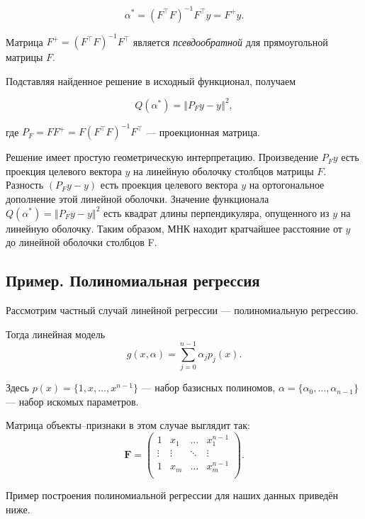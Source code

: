 \documentclass[11pt,a4paper]{article}
\begin{document}
\[ \alpha^* = (F^{\top} F)^{-1} F^{\top} y = F^{+} y. \]

Матрица \(F^{+} = (F^{\top} F)^{-1} F^{\top}\) является
\emph{псевдообратной} для прямоугольной матрицы \(F\).

Подставляя найденное решение в исходный функционал, получаем

\[ Q(\alpha^*) = \left\Vert P_Fy - y \right\Vert^2, \]

где \(P_F = FF^{+} = F(F^{\top}F)^{-1}F^{\top}\) --- проекционная
матрица.

Решение имеет простую геометрическую интерпретацию. Произведение
\(P_Fy\) есть проекция целевого вектора \(y\) на линейную оболочку
столбцов матрицы \(F\). Разность \((P_Fy-y)\) есть проекция целевого
вектора \(y\) на ортогональное дополнение этой линейной оболочки.
Значение функционала \(Q(\alpha^*) = \left\Vert P_Fy - y \right\Vert^2\)
есть квадрат длины перпендикуляра, опущенного из \(y\) на линейную
оболочку. Таким образом, МНК находит кратчайшее расстояние от \(y\) до
линейной оболочки столбцов F.

    \hypertarget{ux43fux440ux438ux43cux435ux440.-ux43fux43eux43bux438ux43dux43eux43cux438ux430ux43bux44cux43dux430ux44f-ux440ux435ux433ux440ux435ux441ux441ux438ux44f}{%
\subsection{Пример. Полиномиальная
регрессия}\label{ux43fux440ux438ux43cux435ux440.-ux43fux43eux43bux438ux43dux43eux43cux438ux430ux43bux44cux43dux430ux44f-ux440ux435ux433ux440ux435ux441ux441ux438ux44f}}

Рассмотрим частный случай линейной регрессии --- полиномиальную
регрессию.

Тогда линейная модель
\[ g(x, \alpha) = \sum_{j=0}^{n-1} \alpha_j p_j(x).\]

Здесь \(p(x) = \{1, x, \ldots, x^{n-1}\}\) --- набор базисных полиномов,
\(\alpha = \{\alpha_0, \ldots, \alpha_{n-1}\}\) --- набор искомых
параметров.

Матрица объекты--признаки в этом случае выглядит так: \[
  \mathbf{F} = 
  \begin{pmatrix}
    1      & x_1    & \ldots & x_1^{n-1} \\
    \vdots & \vdots & \ddots & \vdots    \\
    1      & x_m    & \ldots & x_m^{n-1} \\
  \end{pmatrix}.
\]

Пример построения полиномиальной регрессии для наших данных приведён
ниже.
\end{document}
